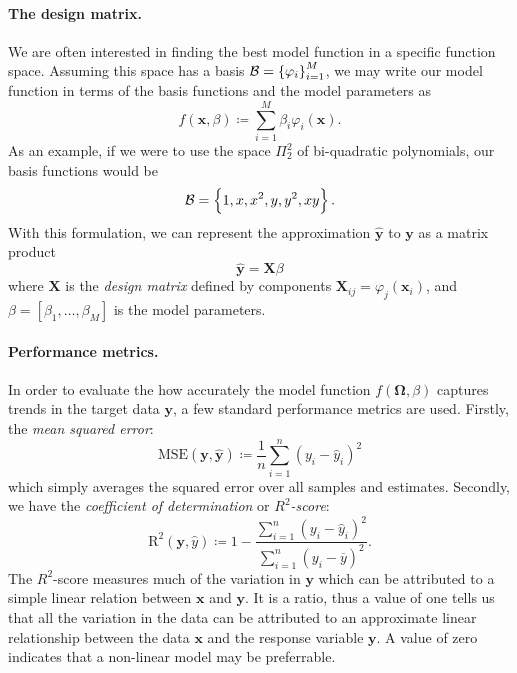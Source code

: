 \documentclass[dvipsnames, article, a4paper, oneside, 12pt]{memoir}
\newcommand{\x}{\bm{x}}
\newcommand{\X}{\bm{X}}
\newcommand{\MSE}[1]{\mathrm{MSE}(#1)}
\newcommand{\R}[1]{\mathrm{R}^2(#1)}
\newcommand{\y}{\bm{y}}
\newcommand{\data}{\bm{\Omega}}
\newcommand{\basis}{\mathcal{B}}
\begin{document}
  \paragraph{The design matrix.} We are often interested in finding the best
  model function in a specific function space.  Assuming this space has a basis
  \( \basis = \set{\varphi_i}_{i=1}^M\), we may write our model function in
  terms of the basis functions and the model parameters as
  \begin{equation}
    \label{eq:gen_lin_mod}
    f(\x, \beta) \coloneqq \sum_{i = 1}^M \beta_i\varphi_i(\x).
  \end{equation}
  As an example, if we were to use the space \( \Pi_2^2 \) of bi-quadratic
  polynomials, our basis functions would be
  \begin{equation}
    \basis = \set{1, x, x^2, y, y^2, xy}.
  \end{equation}
  With this formulation, we can represent the approximation \( \hat{\y} \) to
  \( \y \) as a matrix product 
  \begin{equation}
    \label{eq:matrix_prod}
    \hat{\y} = \X\beta
  \end{equation}
  where \( \X \) is the \emph{design matrix} defined by components \(\X_{ij} =
  \varphi_j(\x_i)\), and \( \beta = [\beta_1, \ldots, \beta_M] \) is the model
  parameters. 

  \paragraph{Performance metrics.}
  In order to evaluate the how accurately the model function \( f(\data, \beta)
  \) captures trends in the target data \( \y \), a few standard performance
  metrics are  used.  Firstly, the \emph{mean squared error}:
  \begin{equation}
    \MSE{\y, \hat{\y}} \coloneqq \frac{1}{n} \sum_{i=1}^n (y_i - \hat{y}_i)^2
  \end{equation}
  which simply averages the squared error over all samples and estimates.
  Secondly, we have the \emph{coefficient of determination} or
  \emph{\(R^2\)-score}:
  \begin{equation}
    \R{\y, \hat{y}} \coloneqq 1 - \frac{\sum_{i=1}^n (y_i -
    \hat{y}_i)^2}{\sum_{i=1}^n (y_i - \overline{y})^2}.
  \end{equation}
  The \(R^2\)-score measures much of the variation in \( \y \) which can be
  attributed to a simple linear relation between \( \x \) and \( \y \). It is a
  ratio, thus a value of one tells us that all the variation in the data can be
  attributed to an approximate linear relationship between the data \(\x\) and
  the response variable \( \y \). A value of zero indicates that a non-linear
  model may be preferrable.
  
\end{document}

